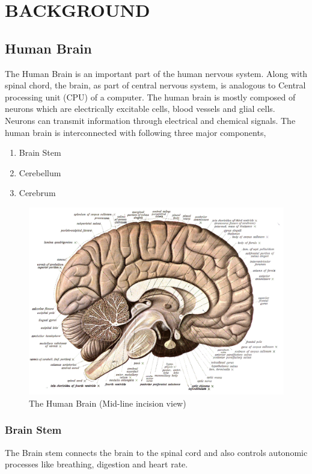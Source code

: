 \chapter{BACKGROUND}
\label{chap-two} 

\section{Human Brain}
	The Human Brain is an important part of the human nervous system. Along with spinal chord, the brain, as part of central nervous system, is analogous to Central processing unit (CPU) of a computer. The human brain is mostly composed of neurons which are electrically excitable cells, blood vessels and glial cells. Neurons can transmit information through electrical and chemical signals. The human brain is interconnected with following three major components,
    \begin{enumerate}
		\item Brain Stem
        \item Cerebellum
        \item Cerebrum
	\end{enumerate}


    \begin{figure}[hbtp]
    	\centering
    	\includegraphics[width=1\textwidth]{Chapter-2/Human_brain}
    	\caption{The Human Brain (Mid-line incision view) \cite{JohannesSobotta}}
    	\label{fig:brain}
  	\end{figure}
    
	\subsection{Brain Stem}
        The Brain stem connects the brain to the spinal cord and also controls autonomic processes like breathing, digestion and heart rate.

